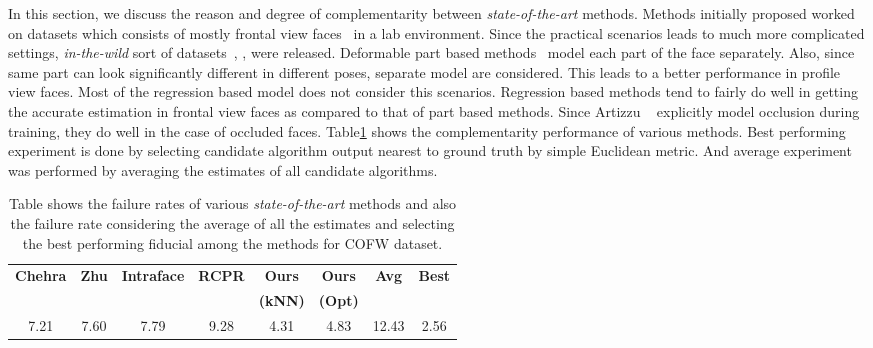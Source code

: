 \label{sec:complementarity_sec}

In this section, we discuss the reason and degree of complementarity between \textit{state-of-the-art}
methods. Methods initially proposed worked on datasets which consists of mostly frontal view faces~\cite{MaB1998} in 
a lab environment. Since the practical scenarios leads to much more complicated settings, \textit{in-the-wild} 
sort of datasets~\cite{koetsingerBFIAT11_AFLW}, \cite{artizzzuICCV13_COFW}, \cite{kumarPAMI13_faceExem} were released.
Deformable part based methods~\cite{xhuCVPR12_wild} model each part of the face separately. Also, since same part can 
look significantly different in different poses, separate model are considered. This leads to a better performance in 
profile view faces. Most of the regression based model does not consider this scenarios. Regression based methods 
tend to fairly do well in getting the accurate estimation in frontal view faces as compared to that of part based
methods. Since Artizzu \etal~\cite{artizzzuICCV13_COFW} explicitly model occlusion during training, they do well 
in the case of occluded faces. Table\ref{table:complementarity} shows the complementarity performance of various
methods. Best performing experiment is done by selecting candidate algorithm output nearest to ground truth by 
simple Euclidean metric. And average experiment was performed by averaging the estimates of all candidate algorithms.

\begin{table}%
   \centering
   \begin{tabular}{c c c c c c c c}
    \toprule[1.5pt]
     {\bf Chehra} &  {\bf Zhu} &  {\bf Intraface} &  {\bf RCPR} & {\bf Ours} & {\bf Ours} & {\bf Avg} & {\bf Best}\\
     & & & & \bf(kNN) & \bf(Opt) & & \\
    \midrule
    7.21 & 7.60 & 7.79 & 9.28 & 4.31 & 4.83 & 12.43 & 2.56 \\ 
    \bottomrule[1.5pt]
    \end{tabular}
    \caption{Table shows the failure rates of various \textit{state-of-the-art} methods and also the failure rate 
    considering the average of all the estimates and selecting the best performing fiducial among the methods for 
    COFW dataset.}
    \label{table:complementarity}
\end{table}
